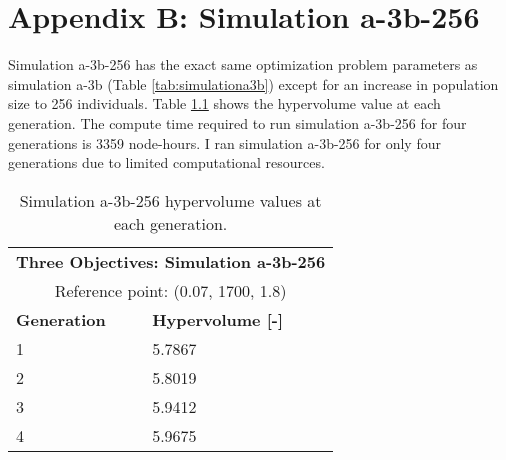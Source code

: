 \chapter{Appendix B: Simulation a-3b-256} 
\renewcommand{\thetable}{B.\arabic{table}}
\setcounter{table}{0}
\renewcommand{\thefigure}{B.\arabic{figure}}
\setcounter{figure}{0}

Simulation a-3b-256 has the exact same optimization problem parameters as simulation 
a-3b (Table \ref{tab:simulationa3b}) except for an increase in population size to 256
individuals. 
Table \ref{tab:a3b-256-hypervolume} shows the hypervolume value at each generation.
The compute time required to run simulation a-3b-256 for four generations is 3359 
node-hours. 
I ran simulation a-3b-256 for only four generations due to limited computational 
resources.  
\begin{table}[htbp!]
    \centering
    \onehalfspacing
    \caption{Simulation a-3b-256 hypervolume values at each generation.}
	\label{tab:a3b-256-hypervolume}
    \footnotesize
    \begin{tabular}{ll}
    \hline 
    \multicolumn{2}{c}{\textbf{Three Objectives: Simulation a-3b-256}} \\
    \multicolumn{2}{c}{Reference point: (0.07, 1700, 1.8)} \\
    \hline 
    \textbf{Generation} & \textbf{Hypervolume [-]} \\
    \hline
    1 & 5.7867 \\
    2 & 5.8019 \\
    3 & 5.9412 \\
    4 & 5.9675 \\
    \hline
    \end{tabular}
\end{table}

